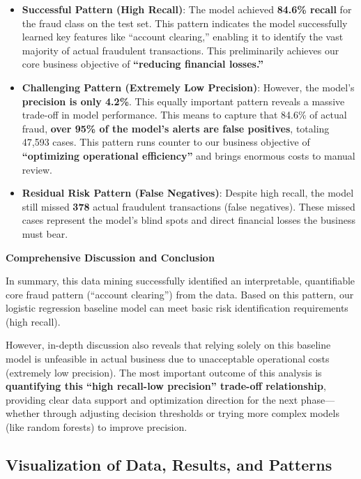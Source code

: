\documentclass[sigplan,screen]{acmart}
\begin{document}
\begin{itemize}
\item \textbf{Successful Pattern (High Recall)}:
    The model achieved \textbf{84.6\% recall} for the fraud class on the test set. This pattern indicates the model successfully learned key features like ``account clearing,'' enabling it to identify the vast majority of actual fraudulent transactions. This preliminarily achieves our core business objective of \textbf{``reducing financial losses.''}
\item \textbf{Challenging Pattern (Extremely Low Precision)}:
    However, the model's \textbf{precision is only 4.2\%}. This equally important pattern reveals a massive trade-off in model performance. This means to capture that 84.6\% of actual fraud, \textbf{over 95\% of the model's alerts are false positives}, totaling 47,593 cases. This pattern runs counter to our business objective of \textbf{``optimizing operational efficiency''} and brings enormous costs to manual review.
\item \textbf{Residual Risk Pattern (False Negatives)}:
    Despite high recall, the model still missed \textbf{378} actual fraudulent transactions (false negatives). These missed cases represent the model's blind spots and direct financial losses the business must bear.
\end{itemize}

\textbf{Comprehensive Discussion and Conclusion}

In summary, this data mining successfully identified an interpretable, quantifiable core fraud pattern (``account clearing'') from the data. Based on this pattern, our logistic regression baseline model can meet basic risk identification requirements (high recall).

However, in-depth discussion also reveals that relying solely on this baseline model is unfeasible in actual business due to unacceptable operational costs (extremely low precision). The most important outcome of this analysis is \textbf{quantifying this ``high recall-low precision'' trade-off relationship}, providing clear data support and optimization direction for the next phase---whether through adjusting decision thresholds or trying more complex models (like random forests) to improve precision.

\subsection{Visualization of Data, Results, and Patterns}
\end{document}
